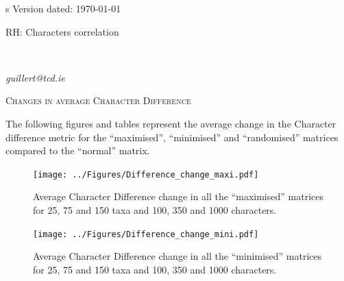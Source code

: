 \documentclass[12pt,letterpaper]{article}
\renewcommand{\section}[1]{%
\bigskip
\begin{center}
\begin{Large}
\normalfont\scshape #1
\medskip
\end{Large}
\end{center}}
\begin{document}
\begin{flushright}s
Version dated: \today
\end{flushright}

\bigskip
\noindent RH: Characters correlation
\bigskip
\medskip
\begin{center}
\bigskip

\\

\end{center}
\medskip
{} \textit{guillert@tcd.ie}\\ 
\vspace{1in}


\newpage

\section{Changes in average Character Difference}

The following figures and tables represent the average change in the Character difference metric for the ``maximised'', ``minimised'' and ``randomised'' matrices compared to the ``normal'' matrix.

\begin{figure}[!htbp]
\centering
   \texttt{[image: ../Figures/Difference\_change\_maxi.pdf]}
\caption{Average Character Difference change in all the ``maximised'' matrices for 25, 75 and 150 taxa and 100, 350 and 1000 characters.}
\end{figure}

\begin{figure}[!htbp]
\centering
   \texttt{[image: ../Figures/Difference\_change\_mini.pdf]}
\caption{Average Character Difference change in all the ``minimised'' matrices for 25, 75 and 150 taxa and 100, 350 and 1000 characters.}
\end{figure}
\end{document}

